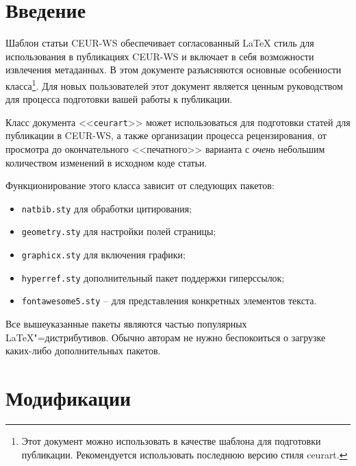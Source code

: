 \documentclass[
12pt,
babel,       %
firacode,    %
wordmath,      %
russian        %
]{isdctart}
\begin{document}

\maketitle

\section{Введение}


Шаблон статьи CEUR-WS обеспечивает согласованный \LaTeX{} стиль для использования в публикациях CEUR-WS и включает в себя возможности извлечения метаданных. В этом документе разъясняются основные особенности класса\footnote{Этот документ можно использовать в качестве шаблона для подготовки публикации. Рекомендуется использовать последнюю версию стиля ceurart.}. Для новых пользователей этот документ является ценным руководством для процесса подготовки вашей работы к публикации.

Класс документа <<\verb|ceurart|>> может использоваться для подготовки статей для публикации в CEUR-WS, а также организации процесса рецензирования, от просмотра до окончательного <<печатного>> варианта с {\itshape очень} небольшим количеством изменений в исходном коде статьи.

Функционирование этого класса зависит от следующих пакетов:

\begin{itemize}
\item \verb|natbib.sty| для обработки цитирования;
\item \verb|geometry.sty| для настройки полей страницы;
\item \verb|graphicx.sty| для включения графики;
\item \verb|hyperref.sty| дополнительный пакет поддержки гиперссылок;
\item \verb|fontawesome5.sty| -- для представления конкретных элементов текста.
\end{itemize}

Все вышеуказанные пакеты являются частью популярных \LaTeX{}"=дистрибутивов. Обычно авторам не нужно беспокоиться о загрузке каких-либо дополнительных пакетов.

\section{Модификации}
\end{document}

